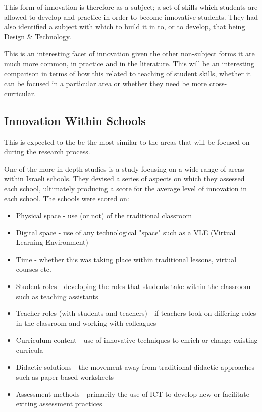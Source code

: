 This form of innovation is therefore as a subject; a set of skills which students are allowed to develop and practice in order to become innovative students. They had also identified a subject with which to build it in to, or to develop, that being Design & Technology.

This is an interesting facet of innovation given the other non-subject forms it are much more common, in practice and in the literature. This will be an interesting comparison in terms of how this related to teaching of student skills, whether it can be focused in a particular area or whether they need be more cross-curricular.

\subsection{Innovation Within Schools}
This is expected to the be the most similar to the areas that will be focused on during the research process.

One of the more in-depth studies is a study focusing on a wide range of areas within Israeli schools. \cite{tubin2003domains} They devised a series of aspects on which they assessed each school, ultimately producing a score for the average level of innovation in each school. The schools were scored on:

\begin{itemize}
\item Physical space - use (or not) of the traditional classroom
\item Digital space - use of any technological "space" such as a VLE (Virtual Learning Environment)
\item Time - whether this was taking place within traditional lessons, virtual courses etc.
\item Student roles - developing the roles that students take within the classroom such as teaching assistants
\item Teacher roles (with students and teachers) - if teachers took on differing roles in the classroom and working with colleagues
\item Curriculum content - use of innovative techniques to enrich or change existing curricula
\item Didactic solutions - the movement away from traditional didactic approaches such as paper-based worksheets
\item Assessment methods - primarily the use of ICT to develop new or facilitate exiting assessment practices
\end{itemize}

